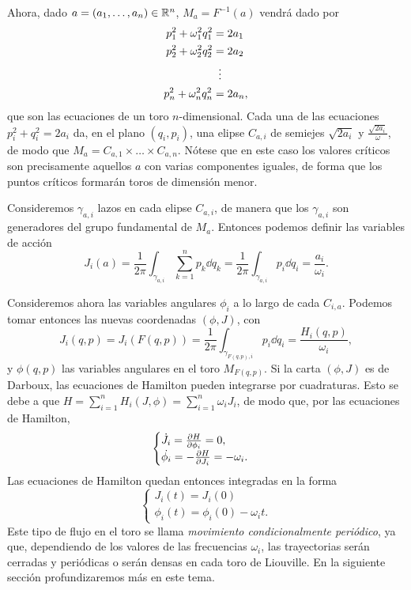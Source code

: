   Ahora, dado $a=(a_1,\dots,a_n)\in \mathbb{R}^n$, $M_a=F^{-1}(a)$ vendrá dado por 
  \begin{align*}[left=\empheqlbrace]
      p_1^2+\omega_1^2q_1^2&=2a_1 \\
      p_2^2+\omega_2^2q_2^2&=2a_2 \\
      & \vdotswithin{=} \\
p_n^2+\omega_n^2q_n^2&=2a_n, 
  \end{align*}
  que son las ecuaciones de un toro $n$-dimensional. Cada una de las ecuaciones $p_i^2+q_i^2=2a_i$ da, en el plano $(q_i,p_i)$, una elipse $C_{a,i}$ de semiejes $\sqrt{2a_i}$ y $\frac{\sqrt{2a_i}}{\omega}$, de modo que $M_a=C_{a,1}\times\dots\times C_{a,n}$. Nótese que en este caso los valores críticos son precisamente aquellos $a$ con varias componentes iguales, de forma que los puntos críticos formarán toros de dimensión menor.

  Consideremos $\gamma_{a,i}$ lazos en cada elipse $C_{a,i}$, de manera que los $\gamma_{a,i}$ son generadores del grupo fundamental de $M_a$. Entonces podemos definir las variables de acción 
  \begin{equation*}
    J_i(a) = \frac{1}{2\pi}\int_{\gamma_{a,i}}\sum_{k=1}^n  p_k \dd q_k=\frac{1}{2\pi}\int_{\gamma_{a,i}}  p_i \dd q_i=\frac{a_i}{\omega_i}.
  \end{equation*}

  Consideremos ahora las variables angulares $\phi_i$ a lo largo de cada $C_{i,a}$. Podemos tomar entonces las nuevas coordenadas $(\phi,J)$, con
  \begin{equation*}
    J_i(q,p)=J_i(F(q,p))=\frac{1}{2\pi}\int_{\gamma_{F(q,p),i}} p_i \dd q_i= \frac{H_i(q,p)}{\omega_i},
  \end{equation*}
  y $\phi(q,p)$ las variables angulares en el toro $M_{F(q,p)}$.
  Si la carta $(\phi,J)$ es de Darboux, las ecuaciones de Hamilton pueden integrarse por cuadraturas. Esto se debe a que $H=\sum_{i=1}^n H_i(J,\phi)=\sum_{i=1}^n \omega_i J_i$, de modo que, por las ecuaciones de Hamilton,
\begin{equation*}
  \begin{cases}
  \dot{J_i}=\frac{\partial H}{\partial \phi_i}=0,\\
  \dot{\phi_i}=-\frac{\partial H}{\partial J_i} = -\omega_i.
  \end{cases}
\end{equation*}
 Las ecuaciones de Hamilton quedan entonces integradas en la forma
\begin{equation*}
  \begin{cases}
  J_i(t)=  J_i(0) \\
  \phi_i(t) =  \phi_i(0) - \omega_i t.
\end{cases}
\end{equation*}
Este tipo de flujo en el toro se llama \emph{movimiento condicionalmente periódico}, ya que, dependiendo de los valores de las frecuencias $\omega_i$, las trayectorias serán cerradas y periódicas o serán densas en cada toro de Liouville. En la siguiente sección profundizaremos más en este tema.

